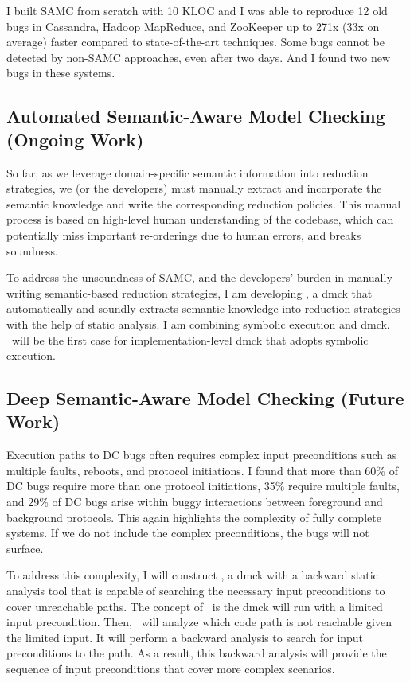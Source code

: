 \documentclass[11pt]{article}
\begin{document}
I built SAMC from scratch with 10 KLOC and I was able to reproduce 12 old bugs
in Cassandra, Hadoop MapReduce, and ZooKeeper up to 271x (33x on average) faster
compared to state-of-the-art techniques. Some bugs cannot be detected by
non-SAMC approaches, even after two days. And I found two new bugs in these
systems.

\subsection{Automated Semantic-Aware Model Checking (Ongoing Work)} 

So far, as we leverage domain-specific semantic information into reduction
strategies, we (or the developers) must manually extract and incorporate the
semantic knowledge and write the corresponding reduction policies. This manual
process is based on high-level human understanding of the codebase, which can
potentially miss important re-orderings due to human errors, and breaks
soundness.

To address the unsoundness of SAMC, and the developers' burden in manually
writing semantic-based reduction strategies, I am developing \autocheck, a dmck
that automatically and soundly extracts semantic knowledge into reduction
strategies with the help of static analysis. I am combining symbolic execution
and dmck. \autocheck\ will be the first case for implementation-level dmck that
adopts symbolic execution. 

\subsection{Deep Semantic-Aware Model Checking (Future Work)}

Execution paths to DC bugs often requires complex input preconditions such as
multiple faults, reboots, and protocol initiations. I found that more than 60\%
of DC bugs require more than one protocol initiations, 35\% require multiple
faults, and 29\% of DC bugs arise within buggy interactions between foreground
and background protocols.  This again highlights the complexity of fully
complete systems. If we do not include the complex preconditions, the bugs will
not surface.

To address this complexity, I will construct \deepcheck, a dmck with a backward
static analysis tool that is capable of searching the necessary input
preconditions to cover unreachable paths. The concept of \deepcheck\ is the dmck
will run with a limited input precondition. Then, \deepcheck\ will analyze which
code path is not reachable given the limited input. It will perform a backward
analysis to search for input preconditions to the path. As a result, this
backward analysis will provide the sequence of input preconditions that cover
more complex scenarios.
\end{document}

